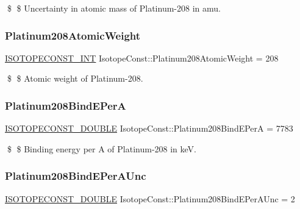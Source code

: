 \$ \$ Uncertainty in atomic mass of Platinum-\/208 in amu. \mbox{\label{group___isotope_const-_platinum-_pt208_gae0e925b185be51844a6e6a48a9c0cf46}} 
\subsubsection{\texorpdfstring{Platinum208\+Atomic\+Weight}{Platinum208AtomicWeight}}
{\footnotesize\ttfamily \mbox{\hyperlink{group___isotope_const-_macros_ga5f18360b3e99483a35c32d789e62621c}{I\+S\+O\+T\+O\+P\+E\+C\+O\+N\+S\+T\+\_\+\+I\+NT}} Isotope\+Const\+::\+Platinum208\+Atomic\+Weight = 208}

\$ \$ Atomic weight of Platinum-\/208. \mbox{\label{group___isotope_const-_platinum-_pt208_ga689ad10379214e71c1730d01ccfe1f23}} 
\subsubsection{\texorpdfstring{Platinum208\+Bind\+E\+PerA}{Platinum208BindEPerA}}
{\footnotesize\ttfamily \mbox{\hyperlink{group___isotope_const-_macros_ga8f45a7272ce02c0b4c65c44636ed719a}{I\+S\+O\+T\+O\+P\+E\+C\+O\+N\+S\+T\+\_\+\+D\+O\+U\+B\+LE}} Isotope\+Const\+::\+Platinum208\+Bind\+E\+PerA = 7783}

\$ \$ Binding energy per A of Platinum-\/208 in keV. \mbox{\label{group___isotope_const-_platinum-_pt208_gaf79c2f943bb34488fd466907fba66437}} 
\subsubsection{\texorpdfstring{Platinum208\+Bind\+E\+Per\+A\+Unc}{Platinum208BindEPerAUnc}}
{\footnotesize\ttfamily \mbox{\hyperlink{group___isotope_const-_macros_ga8f45a7272ce02c0b4c65c44636ed719a}{I\+S\+O\+T\+O\+P\+E\+C\+O\+N\+S\+T\+\_\+\+D\+O\+U\+B\+LE}} Isotope\+Const\+::\+Platinum208\+Bind\+E\+Per\+A\+Unc = 2}

